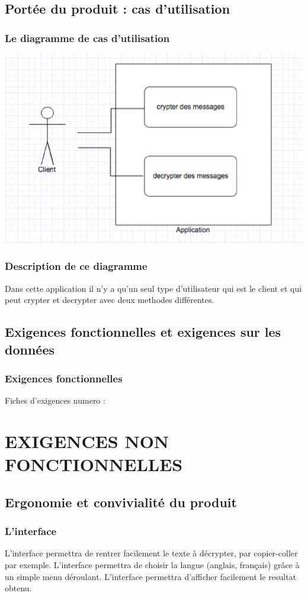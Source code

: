 \documentclass[a4]{article}
\begin{document}
		\subsection{Portée du produit : cas d’utilisation}
			\subsubsection {Le diagramme de cas d'utilisation} 
				\includegraphics[scale=0.5]{dia.eps} 
			\subsubsection {Description de ce diagramme}
				Dans cette application il n'y a qu'un seul type d'utilisateur qui est le client 
				et qui peut crypter et decrypter avec deux methodes différentes.
		\subsection{Exigences fonctionnelles et exigences sur les données}
			\subsubsection {Exigences fonctionnelles}
				Fiches d'exigences numero :
	\section{EXIGENCES NON FONCTIONNELLES}
		\subsection{Ergonomie et convivialité du produit}
			\subsubsection {L'interface}
				L'interface permettra de rentrer facilement le texte à décrypter, par copier-coller par 				exemple.
				L'interface permettra de choisir la langue (anglais, français) grâce à un simple menu 					déroulant.
				L'interface permettra d'afficher facilement le resultat obtenu.
\end{document}
